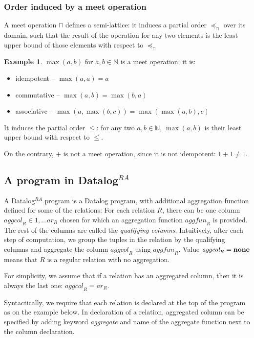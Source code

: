 \documentclass{pracamgr}
\theoremstyle{plain}
\theoremstyle{definition}
\newtheorem{exmp}{Example}[section]
\theoremstyle{remark}
\newcommand{\datalogra}{Datalog$^{RA}$ }
\newcommand{\aggfun}{\textit{aggfun} }
\newcommand{\aggcol}{\textit{aggcol} }
\begin{document}
\subsubsection{Order induced by a meet operation}

A meet operation $\sqcap$ defines a semi-lattice: it induces a partial order $\preceq_\sqcap$ over its domain, such that the result of the operation for any two elements is the least upper bound of those elements with respect to $\preceq_\sqcap$

\begin{exmp}
$\max(a, b)$ for $a, b \in \mathbb{N}$ is a meet operation; it is:
\begin{itemize}
\item idempotent -- $\max(a, a) = a$
\item commutative -- $\max(a, b) = \max(b, a)$
\item associative -- $\max(a, \max(b, c)) = \max(\max(a, b), c)$
\end{itemize}
It induces the partial order $\le$: for any two $a, b \in \mathbb{N}$, $\max(a, b)$ is their least upper bound with respect to $\le$.


On the contrary, $+$ is not a meet operation, since it is not idempotent: $1+1 \ne 1$.
\end{exmp}

\subsection{A program in \datalogra}
A \datalogra program is a Datalog program, with additional aggregation function defined for some of the relations:
For each relation $R$, there can be one column $\aggcol_R \in {1, \dots ar_R}$ chosen for which an aggregation function $\aggfun_R$ is provided. The rest of the columns are called the \emph{qualifying columns}. Intuitively, after each step of computation, we group the tuples in the relation by the qualifying columns and aggregate the column $\aggcol_R$ using $\aggfun_R$. Value $\aggcol_R = \bf{none}$ means that $R$ is a regular relation with no aggregation.

For simplicity, we assume that if a relation has an aggregated column, then it is always the last one: $\aggcol_R = ar_R$.

Syntactically, we require that each relation is declared at the top of the program as on the example below. In declaration of a relation, aggregated column can be specified by adding keyword \textit{aggregate} and name of the aggregate function next to the column declaration.
\end{document}
